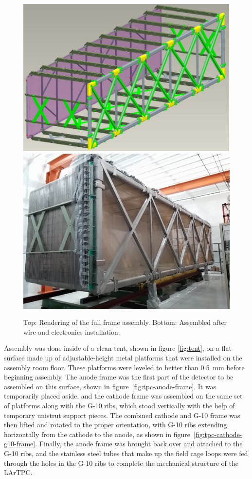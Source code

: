 \begin{figure}[htb]
\centering	
\includegraphics[width=0.8\linewidth]{figures/tpc-3drendering.pdf}
\includegraphics[width=0.8\linewidth]{figures/tpc-completed-upstream-right.jpg}
\caption{Top: Rendering of the full \lartpc frame assembly.  Bottom: Assembled \lartpc after wire and electronics installation.}
\label{fig:tpc-full}
\end{figure}

Assembly was done inside of a clean tent, shown in figure \ref{fig:tent}, on a flat surface made up of adjustable-height metal platforms that were installed on the assembly room floor.  These platforms were leveled to better than 0.5~mm before beginning assembly.  The anode frame was the first part of the detector to be assembled on this surface, shown in figure~\ref{fig:tpc-anode-frame}. It was temporarily placed aside, and the cathode frame was assembled on the same set of platforms along with the G-10 ribs, which stood vertically with the help of temporary unistrut support pieces.  The combined cathode and G-10 frame was then lifted and rotated to the proper orientation, with G-10 ribs extending horizontally from the cathode to the anode, as shown in figure~\ref{fig:tpc-cathode-g10-frame}. Finally, the anode frame was brought back over and attached to the G-10 ribs, and the stainless steel tubes that make up the field cage loops were fed through the holes in the G-10 ribs to complete the mechanical structure of the LArTPC. 

